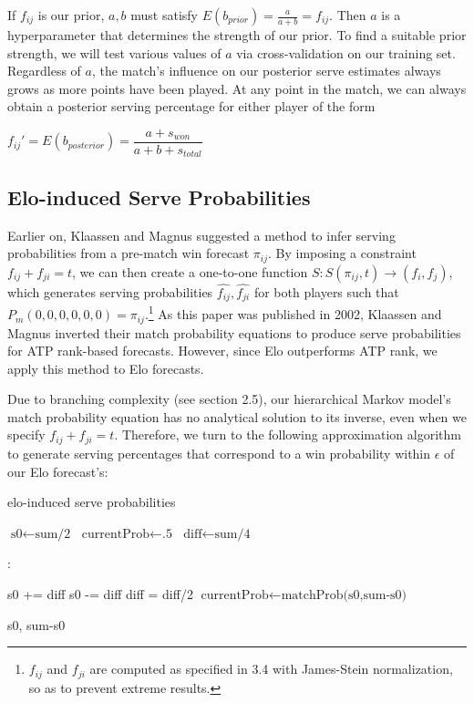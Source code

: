 \documentclass[chapterprefix=false]{report}
\begin{document}
If $f_{ij}$ is our prior, $a,b$ must satisfy $E(b_{prior}) = \frac{a}{a+b} = f_{ij}$. Then $a$ is a hyperparameter that determines the strength of our prior. To find a suitable prior strength, we will test various values of $a$ via cross-validation on our training set. Regardless of $a$, the match's influence on our posterior serve estimates always grows as more points have been played. At any point in the match, we can always obtain a posterior serving percentage for either player of the form

$f_{ij}' = E(b_{posterior}) = \dfrac{a + s_{won}}{a + b + s_{total}}$



\subsection{Elo-induced Serve Probabilities}
Earlier on, Klaassen and Magnus suggested a method to infer serving probabilities from a pre-match win forecast $\pi_{ij}$. By imposing a constraint $f_{ij}+f_{ji}=t$, we can then create a one-to-one function 
$S: S(\pi_{ij},t) \rightarrow (f_i,f_j)$, which generates serving probabilities $\hat{f_{ij}},\hat{f_{ji}}$ for both players such that $P_{m}(0,0,0,0,0,0)=\pi_{ij}$.\footnote{$f_{ij}$ and $f_{ji}$ are computed as specified in 3.4 with James-Stein normalization, so as to prevent extreme results.} As this paper was published in 2002, Klaassen and Magnus inverted their match probability equations to produce serve probabilities for ATP rank-based forecasts. However, since Elo outperforms ATP rank, we apply this method to Elo forecasts.

Due to branching complexity (see section 2.5), our hierarchical Markov model's match probability equation has no analytical solution to its inverse, even when we specify $f_{ij}+f_{ji}=t$. Therefore, we turn to the following approximation algorithm to generate serving percentages that correspond to a win probability within $\epsilon$ of our Elo forecast's:

\begin{algorithm}[H]
\caption{elo-induced serve probabilities}\label{euclid}
\begin{algorithmic}[H]
\State $\text{s0} \gets \text{sum/2}$
\State $\text{currentProb} \gets \text{.5}$
\State $\text{diff} \gets \text{sum/4}$

:

\State s0 += diff 
\Else
\State s0 -= diff
\EndIf
\State diff = diff/2
\State $\text{currentProb} \gets \text{matchProb(s0,sum-s0)}$

\EndWhile


\State \Return s0, sum-s0

\EndProcedure
\end{algorithmic}
\end{algorithm}
\end{document}
